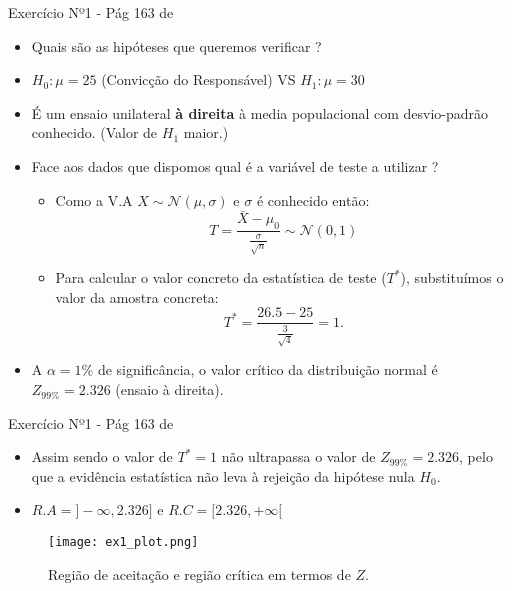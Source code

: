 \documentclass[10,5pt, pdf]{beamer}
\begin{document}
\begin{frame}{Exercício Nº1 - Pág 163 de \cite{reis2021}}
\begin{itemize}
\item{Quais são as hipóteses que queremos verificar ?}
\pause
\item{$H_0:\mu=25$ (Convicção do Responsável) VS $H_1:\mu=30$}
\pause
\item{É um ensaio unilateral \textbf{à direita} à media populacional com desvio-padrão conhecido. (Valor de $H_1$ maior.)}
\pause
\item{Face aos dados que dispomos qual é a variável de teste  a utilizar ?}
\begin{itemize}
\item{Como a V.A $X\sim\mathcal{N}(\mu,\sigma)$ e $\sigma$ é conhecido então:}
\begin{equation}
T=\frac{\bar{X} - \mu_0}{\frac{\sigma}{\sqrt{n}}}\sim \mathcal{N}(0,1)
\end{equation}
\pause
\item{Para calcular o valor concreto da estatística de teste ($T^*$), substituímos o valor da amostra concreta:}
\pause
\begin{equation}
T^*=\frac{26.5 - 25}{\frac{3}{\sqrt{4}}}=1.    
\end{equation}
\pause
\end{itemize}
\item{A $\alpha=1\%$ de significância, o valor crítico da distribuição normal é $Z_{99\%}=2.326$ (ensaio à direita).}
\end{itemize}
\end{frame}

\begin{frame}{Exercício Nº1 - Pág 163 de \cite{reis2021}}
\begin{itemize}
\item{Assim sendo o valor de $T^*=1$ não ultrapassa o valor de $Z_{99\%}=2.326$, pelo que a evidência estatística não leva à rejeição da hipótese nula $H_0$.}
\pause
\item{$R.A=]-\infty, 2.326]$ e $R.C=[2.326, +\infty[$}
\end{itemize}
\pause
\begin{figure}
    \centering
    \texttt{[image: ex1\_plot.png]}
    \caption{Região de aceitação e região crítica em termos de $Z$.}
\end{figure}
\end{frame}
\end{document}
